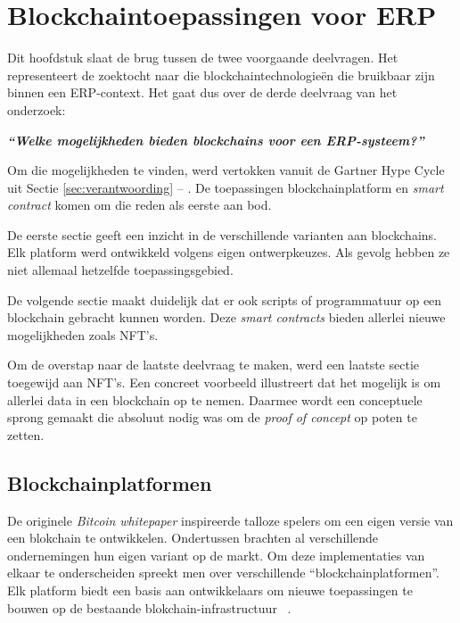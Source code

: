 \chapter{Blockchaintoepassingen voor ERP}
\label{ch:blockchaintoepassingen-voor-erp}

Dit hoofdstuk slaat de brug tussen de twee voorgaande deelvragen. Het representeert de zoektocht naar die blockchaintechnologieën die bruikbaar zijn binnen een ERP-context. Het gaat dus over de derde deelvraag van het onderzoek:

\begin{center}
	\textit{\textbf{``Welke mogelijkheden bieden blockchains voor een ERP-systeem?''}}
\end{center}

Om die mogelijkheden te vinden, werd vertokken vanuit de Gartner Hype Cycle uit Sectie \ref{sec:verantwoording} -- . De toepassingen blockchainplatform en \textit{smart contract} komen om die reden als eerste aan bod.

De eerste sectie geeft een inzicht in de verschillende varianten aan blockchains. Elk platform werd ontwikkeld volgens eigen ontwerpkeuzes. Als gevolg hebben ze niet allemaal hetzelfde toepassingsgebied.

De volgende sectie maakt duidelijk dat er ook scripts of programmatuur op een blockchain gebracht kunnen worden. Deze \textit{smart contracts} bieden allerlei nieuwe mogelijkheden zoals NFT's. 

Om de overstap naar de laatste deelvraag te maken, werd een laatste sectie toegewijd aan NFT's. Een concreet voorbeeld illustreert dat het mogelijk is om allerlei data in een blockchain op te nemen. Daarmee wordt een conceptuele sprong gemaakt die absoluut nodig was om de \textit{proof of concept} op poten te zetten.

\section{Blockchainplatformen}
\label{sec:blockchainplatformen}

De originele \textit{Bitcoin} \textit{whitepaper} inspireerde talloze spelers om een eigen versie van een blokchain te ontwikkelen. Ondertussen brachten al verschillende ondernemingen hun eigen variant op de markt. Om deze implementaties van elkaar te onderscheiden spreekt men over verschillende ``blockchainplatformen''. Elk platform biedt een basis aan ontwikkelaars om nieuwe toepassingen te bouwen op de bestaande blokchain-infrastructuur
~\autocite{Saraf2018}.

